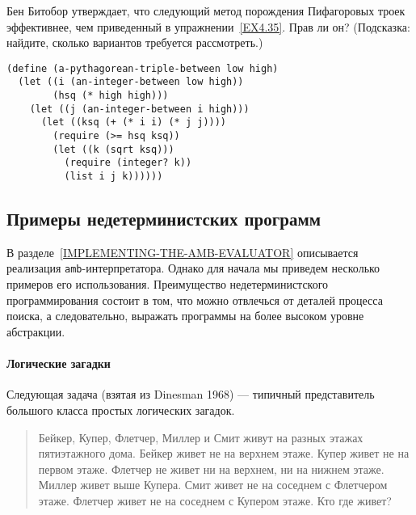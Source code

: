 \begin{exercise}{4.37}%
\label{EX4.37}%
Бен Битобор утверждает, что следующий метод порождения
Пифагоровых троек
эффективнее, чем приведенный в 
упражнении~\ref{EX4.35}.  Прав ли он?  (Подсказка: найдите, сколько
вариантов требуется рассмотреть.)

\begin{Verbatim}[fontsize=\small]
(define (a-pythagorean-triple-between low high)
  (let ((i (an-integer-between low high))
        (hsq (* high high)))
    (let ((j (an-integer-between i high)))
      (let ((ksq (+ (* i i) (* j j))))
        (require (>= hsq ksq))
        (let ((k (sqrt ksq)))
          (require (integer? k))
          (list i j k))))))
\end{Verbatim}
\end{exercise}

\subsection{Примеры недетерминистских программ}
\label{EXAMPLES-OF-NONDETERMINISTIC-PROGRAMS}%

В разделе~\ref{IMPLEMENTING-THE-AMB-EVALUATOR}
описывается реализация {\tt amb}-интерпретатора.  Однако
для начала мы приведем несколько примеров его использования.
Преимущество недетерминистского программирования
состоит в том, что можно отвлечься от деталей процесса
поиска, а следовательно, выражать программы на более высоком уровне
абстракции.

\paragraph{Логические загадки}


Следующая задача (взятая из 
Dinesman 1968)
--- типичный представитель большого класса простых логических
загадок.
\begin{quote}
Бейкер, Купер, Флетчер, Миллер и Смит живут на разных этажах
пятиэтажного дома.  Бейкер живет не на верхнем этаже.  Купер живет не
на первом этаже. Флетчер не живет ни на верхнем, ни на нижнем этаже.
Миллер живет выше Купера. Смит живет не на соседнем с Флетчером этаже.
Флетчер живет не на соседнем с Купером этаже.  Кто где живет?
\end{quote}

